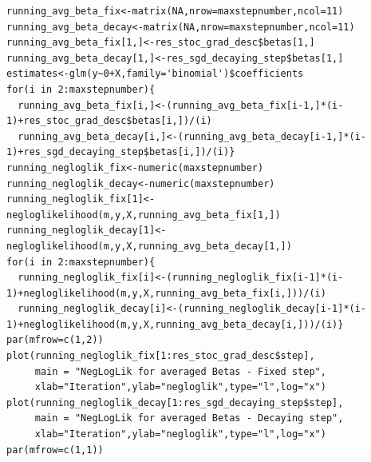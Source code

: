 \documentclass{article}
\begin{document}
\begin{lstlisting}[basicstyle=\tiny]
running_avg_beta_fix<-matrix(NA,nrow=maxstepnumber,ncol=11)
running_avg_beta_decay<-matrix(NA,nrow=maxstepnumber,ncol=11)
running_avg_beta_fix[1,]<-res_stoc_grad_desc$betas[1,]
running_avg_beta_decay[1,]<-res_sgd_decaying_step$betas[1,]
estimates<-glm(y~0+X,family='binomial')$coefficients
for(i in 2:maxstepnumber){
  running_avg_beta_fix[i,]<-(running_avg_beta_fix[i-1,]*(i-1)+res_stoc_grad_desc$betas[i,])/(i)
  running_avg_beta_decay[i,]<-(running_avg_beta_decay[i-1,]*(i-1)+res_sgd_decaying_step$betas[i,])/(i)}
running_negloglik_fix<-numeric(maxstepnumber)
running_negloglik_decay<-numeric(maxstepnumber)
running_negloglik_fix[1]<-negloglikelihood(m,y,X,running_avg_beta_fix[1,])
running_negloglik_decay[1]<-negloglikelihood(m,y,X,running_avg_beta_decay[1,])
for(i in 2:maxstepnumber){
  running_negloglik_fix[i]<-(running_negloglik_fix[i-1]*(i-1)+negloglikelihood(m,y,X,running_avg_beta_fix[i,]))/(i)
  running_negloglik_decay[i]<-(running_negloglik_decay[i-1]*(i-1)+negloglikelihood(m,y,X,running_avg_beta_decay[i,]))/(i)}
par(mfrow=c(1,2))
plot(running_negloglik_fix[1:res_stoc_grad_desc$step],
     main = "NegLogLik for averaged Betas - Fixed step",
     xlab="Iteration",ylab="negloglik",type="l",log="x")
plot(running_negloglik_decay[1:res_sgd_decaying_step$step],
     main = "NegLogLik for averaged Betas - Decaying step",
     xlab="Iteration",ylab="negloglik",type="l",log="x")
par(mfrow=c(1,1))
\end{lstlisting}
\end{document}
